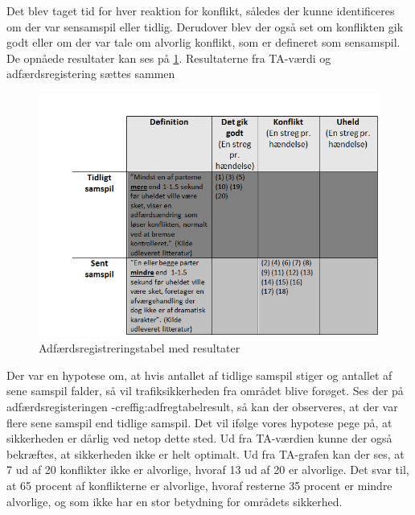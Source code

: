 Det blev taget tid for hver reaktion for konflikt, således der kunne identificeres om der var sensamspil eller tidlig. Derudover blev der også set om konflikten gik godt eller om der var tale om alvorlig konflikt, som er defineret som sensamspil. De opnåede resultater kan ses på \cref{fig:adfregtabelresult}.
Resultaterne fra TA-værdi og adfærdsregistering sættes sammen
\begin{figure}[htbp]
  \centering
  \begin{adjustbox}{max width=\textwidth}
    \includegraphics{figures/Billederogfigur/obstabelresult.png} %
 \end{adjustbox}
  \caption{Adfærdsregistreringstabel med resultater \autocite{adf}}
  \label{fig:adfregtabelresult}
\end{figure}
Der var en hypotese om, at hvis antallet af tidlige samspil stiger og antallet af sene samspil falder, så vil trafiksikkerheden fra området blive forøget. Ses der på adfærdsregisteringen -cref{fig:adfregtabelresult}, så kan der observeres, at der var flere sene samspil end tidlige samspil. Det vil ifølge vores hypotese pege på, at sikkerheden er dårlig ved netop dette sted. Ud fra TA-værdien kunne der også bekræftes, at sikkerheden ikke er helt optimalt.
Ud fra TA-grafen kan der ses, at 7 ud af 20 konflikter ikke er alvorlige, hvoraf 13 ud af 20 er alvorlige. Det svar til, at 65 procent af konflikterne er alvorlige, hvoraf resterne 35 procent er mindre alvorlige, og som ikke har en stor betydning for områdets sikkerhed.

